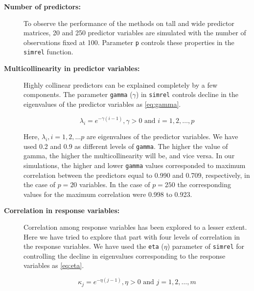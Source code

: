 \documentclass[review]{elsarticle}
\begin{document}
\begin{description}
\item[\textbf{Number of predictors:}]
To observe the performance of the methods on tall and wide predictor matrices, 20 and 250 predictor variables are simulated with the number of observations fixed at 100. Parameter \texttt{p} controls these properties in the \texttt{simrel} function.
\item[\textbf{Multicollinearity in predictor variables:}]
Highly collinear predictors can be explained completely by a few components. The parameter \texttt{gamma} (\(\gamma\)) in \texttt{simrel} controls decline in the eigenvalues of the predictor variables as \eqref{eq:gamma}.

\begin{equation}
  \lambda_i = e^{-\gamma(i - 1)}, \gamma > 0 \text{ and } i = 1, 2, \ldots, p
  \label{eq:gamma}
\end{equation}

Here, \(\lambda_i, i = 1, 2, \ldots p\) are eigenvalues of the predictor variables. We have used 0.2 and 0.9 as different levels of \texttt{gamma}. The higher the value of gamma, the higher the multicollinearity will be, and vice versa. In our simulations, the higher and lower \texttt{gamma} values corresponded to maximum correlation between the predictors equal to 0.990 and 0.709, respectively, in the case of \(p = 20\) variables. In the case of \(p = 250\) the corresponding values for the maximum correlation were 0.998 to 0.923.
\item[\textbf{Correlation in response variables:}]
Correlation among response variables has been explored to a lesser extent. Here we have tried to explore that part with four levels of correlation in the response variables. We have used the \texttt{eta} (\(\eta\)) parameter of \texttt{simrel} for controlling the decline in eigenvalues corresponding to the response variables as \eqref{eq:eta}.

\begin{equation}
  \kappa_j = e^{-\eta(j - 1)}, \eta > 0 \text{ and } j = 1, 2, \ldots, m
  \label{eq:eta}
\end{equation}


\end{description}
\end{document}
